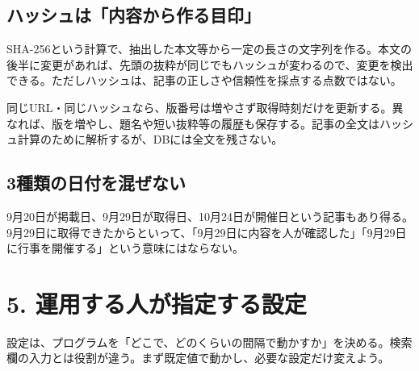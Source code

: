 \documentclass[a4paper,10pt]{ltjsarticle}
\begin{document}
\subsection*{ハッシュは「内容から作る目印」}

SHA-256という計算で、抽出した本文等から一定の長さの文字列を作る。本文の後半に変更があれば、先頭の抜粋が同じでもハッシュが変わるので、変更を検出できる。ただしハッシュは、記事の正しさや信頼性を採点する点数ではない。


同じURL・同じハッシュなら、版番号は増やさず取得時刻だけを更新する。異なれば、版を増やし、題名や短い抜粋等の履歴も保存する。記事の全文はハッシュ計算のために解析するが、DBには全文を残さない。


\subsection*{3種類の日付を混ぜない}

9月20日が掲載日、9月29日が取得日、10月24日が開催日という記事もあり得る。9月29日に取得できたからといって、「9月29日に内容を人が確認した」「9月29日に行事を開催する」という意味にはならない。


\clearpage

\section*{5. 運用する人が指定する設定}

設定は、プログラムを「どこで、どのくらいの間隔で動かすか」を決める。検索欄の入力とは役割が違う。まず既定値で動かし、必要な設定だけ変えよう。
\end{document}
